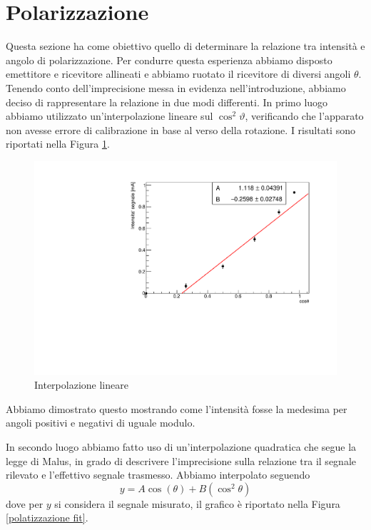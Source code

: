 \section{Polarizzazione}
Questa sezione ha come obiettivo quello di determinare la relazione tra intensità e angolo di polarizzazione.
Per condurre questa esperienza abbiamo disposto emettitore e ricevitore allineati e abbiamo ruotato il ricevitore di diversi angoli $\theta$.
Tenendo conto dell'imprecisione messa in evidenza nell'introduzione, abbiamo deciso di rappresentare la relazione in due modi differenti.
In primo luogo abbiamo utilizzato un'interpolazione lineare sul $\cos^2\vartheta$, verificando che l'apparato non avesse errore di calibrazione in base al verso della rotazione. I risultati sono riportati nella Figura \ref{polatizzazione fit quadratico}.
\begin{figure}[h!]
    \centering
    \includegraphics[scale=.5]{Immagini/coseni quadri lineare.pdf} 
    \caption{Interpolazione lineare}
    \label{polatizzazione fit quadratico}
\end{figure}
Abbiamo dimostrato questo mostrando come l'intensità fosse la medesima per angoli positivi e negativi di uguale modulo.

In secondo luogo abbiamo fatto uso di un'interpolazione quadratica che segue la legge di Malus, in grado di descrivere l'imprecisione sulla relazione tra il segnale rilevato e l'effettivo segnale trasmesso. Abbiamo interpolato seguendo 
$$
y=A\cos(\theta) + B(\cos^2\theta)
$$
dove per $y$ si considera il segnale misurato, il grafico è riportato nella Figura \ref{polatizzazione fit}.

